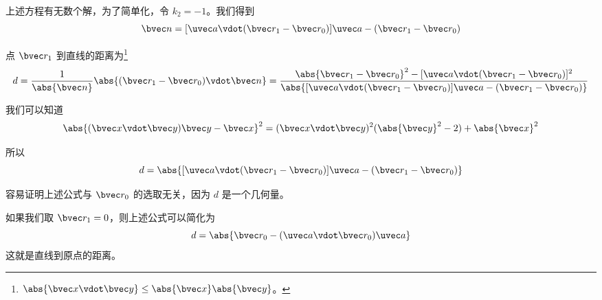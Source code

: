 上述方程有无数个解，为了简单化，令 $k_2 = -1$。我们得到
\begin{equation}
\bvec n = [\uvec a \vdot (\bvec r_1 -\bvec r_0)]\uvec a - (\bvec r_1 - \bvec r_0)
\end{equation}

点 $\bvec r_1$ 到直线的距离为\footnote{$\abs{\bvec x \vdot \bvec y}\leq \abs{\bvec x}\abs{\bvec y}$。}
\begin{equation}
d=\frac{1}{\abs{\bvec n}}\abs{(\bvec r_1 - \bvec r_0) \vdot \bvec n}=\frac{\abs{\bvec r_1 - \bvec r_0}^2 - [\uvec a \vdot (\bvec r_1 - \bvec r_0)]^2
}{\abs{[\uvec a \vdot (\bvec r_1 - \bvec r_0)]\uvec a - (\bvec r_1 - \bvec r_0)}}
\end{equation}

我们可以知道
\begin{equation}
\abs{(\bvec x \vdot \bvec y)\bvec y - \bvec x}^2=(\bvec x \vdot \bvec y)^2 (\abs{\bvec y}^2-2) + \abs{\bvec x}^2
\end{equation}

所以
\begin{equation}
d=\abs{[\uvec a \vdot (\bvec r_1 - \bvec r_0)]\uvec a - (\bvec r_1 - \bvec r_0)}
\end{equation}

容易证明上述公式与 $\bvec r_0$ 的选取无关，因为 $d$ 是一个几何量。

如果我们取 $\bvec r_1=0$，则上述公式可以简化为
\begin{equation}
d=\abs{\bvec r_0 - (\uvec a \vdot \bvec r_0)\uvec a}
\end{equation}
这就是直线到原点的距离。

